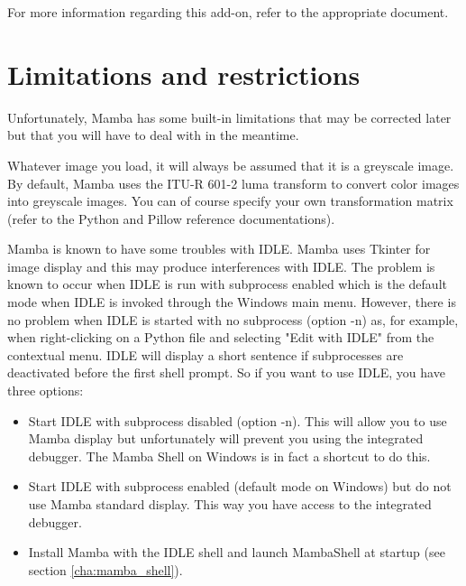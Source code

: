 \documentclass[a4paper,10pt,oneside]{article}
\begin{document}

For more information regarding this add-on, refer to the appropriate document.

\pagebreak

\section{Limitations and restrictions}
\label{cha:lim_restrict}

Unfortunately, Mamba has some built-in limitations that may be corrected later
but that you will have to deal with in the meantime.

Whatever image you load, it will always be assumed that it is a greyscale image.
By default, Mamba uses the ITU-R 601-2 luma transform to convert color images 
into greyscale images. You can of course specify your own transformation matrix 
(refer to the Python and Pillow reference documentations).

Mamba is known to have some troubles with IDLE. Mamba uses
Tkinter for image display and this may produce interferences with IDLE. The
problem is known to occur when IDLE is run with subprocess enabled which is the
default mode when IDLE is invoked through the Windows main menu. However, there 
is no problem when IDLE is started with no subprocess (option -n) as, for 
example, when right-clicking on a Python file and selecting "Edit with IDLE" from
the contextual menu. IDLE will display a short sentence if subprocesses are
deactivated before the first shell prompt. So if you want to use IDLE, you have
three options:

\begin{itemize}
\item Start IDLE with subprocess disabled (option -n). This will allow you to 
use Mamba display but unfortunately will prevent you using the integrated
debugger. The Mamba Shell on Windows is in fact a shortcut to do this.
\item Start IDLE with subprocess enabled (default mode on Windows) but do not
use Mamba standard display. This way you have access to the integrated debugger.
\item Install Mamba with the IDLE shell and launch MambaShell at startup (see
section \ref{cha:mamba_shell}).
\end{itemize}
\end{document}
